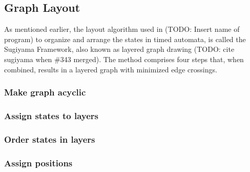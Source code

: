 \subsection{Graph Layout}



As mentioned earlier, the layout algorithm used in (TODO: Insert name of program) to organize and arrange the states in timed automata, is called the Sugiyama Framework, also known as layered graph drawing (TODO: cite sugiyama when \#343 merged). The method comprises four steps that, when combined, results in a layered graph with minimized edge crossings.


\subsubsection{Make graph acyclic}
\subsubsection{Assign states to layers}
\subsubsection{Order states in layers}
\subsubsection{Assign positions}